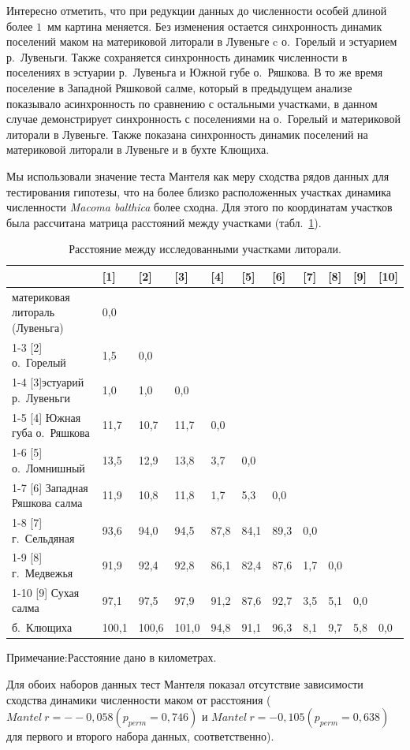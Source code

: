 Интересно отметить, что при редукции данных до численности особей длиной более $1$~мм картина меняется.
Без изменения остается синхронность динамик поселений маком на материковой литорали в Лувеньге c о.~Горелый и эстуарием р.~Лувеньги.
Также сохраняется синхронность динамик численности в поселениях в эстуарии р.~Лувеньга и Южной губе о.~Ряшкова.
В то же время поселение в Западной Ряшковой салме, который в предыдущем анализе показывало асинхронность по сравнению с остальными участками, в данном случае демонстрирует синхронность с поселениями на о.~Горелый и материковой литорали в Лувеньге.
Также показана синхронность динамик поселений на материковой литорали в Лувеньге и в бухте Клющиха.

Мы использовали значение теста Мантеля как меру сходства рядов данных для тестирования гипотезы, что на более близко расположенных участках динамика численности {\it Macoma balthica} более сходна.
Для этого по координатам участков была рассчитана матрица расстояний между участками (табл.~\ref{tab:distance_area_km}).
	\begin{table}[p]
	\caption{Расстояние между исследованными участками литорали.}
	\label{tab:distance_area_km}
        \begin{tabular}{|p{}|*{10}{p{}|}} \hline
	 & [1] & [2] & [3] & [4] & [5] & [6] & [7] & [8] & [9] & [10]
	\\ \hline
	[1] материковая литораль (Лувеньга) & 0,0 &  &  &  &  &  &  &  &  & 
	\\ \cline{1-3}
	[2] о.~Горелый & 1,5 & 0,0 &  &  &  &  &  &  &  &  
	\\ \cline{1-4}
	[3]эстуарий р.~Лувеньги & 1,0 & 1,0 & 0,0 &  &  &  &  &  &  &  
	\\ \cline{1-5}
	[4] Южная губа о.~Ряшкова & 11,7 & 10,7 & 11,7 & 0,0 &  &  &  &  &  & 
	\\ \cline{1-6}
	[5] о.~Ломнишный & 13,5 & 12,9 & 13,8 & 3,7 & 0,0 &  &  &  &  &  
	\\ \cline{1-7}
	[6] Западная Ряшкова салма & 11,9 & 10,8 & 11,8 & 1,7 & 5,3 & 0,0 &  &  &  &  
	\\ \cline{1-8}
	[7] г.~Сельдяная & 93,6 & 94,0 & 94,5 & 87,8 & 84,1 & 89,3 & 0,0 &  &  &  
	\\ \cline{1-9}
	[8] г.~Медвежья & 91,9 & 92,4 & 92,8 & 86,1 & 82,4 & 87,6 & 1,7 & 0,0 &  &  
	\\ \cline{1-10}
	[9] Сухая салма & 97,1 & 97,5 & 97,9 & 91,2 & 87,6 & 92,7 & 3,5 & 5,1 & 0,0 &  
	\\ \hline
	[10] б.~Клющиха & 100,1 & 100,6 & 101,0 & 94,8 & 91,1 & 96,3 & 8,1 & 9,7 & 5,8 & 0,0
	\\ \hline
	\end{tabular}
	   {\footnotesize Примечание:Расстояние дано в километрах.}
	\end{table}

Для обоих наборов данных тест Мантеля показал отсутствие зависимости сходства динамики численности маком от расстояния ( $Mantel\ r = --0,058 (p_{perm} = 0,746)$ и $Mantel\ r = -0,105 (p_{perm} = 0,638)$ для первого и второго набора данных, соответственно).

\afterpage{\clearpage}
